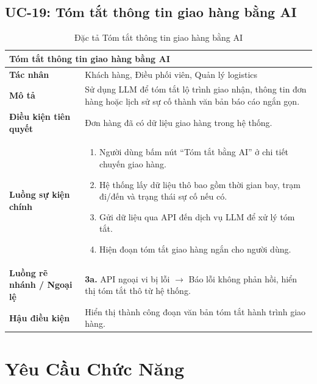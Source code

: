 \subsection{UC-19: Tóm tắt thông tin giao hàng bằng AI}
\begin{table}[H]
  \centering
  \begin{tabularx}{\textwidth}{|l|X|}
    \hline
    \multicolumn{2}{|l|}{\textbf{Tóm tắt thông tin giao hàng bằng AI}} \\
    \hline
    \textbf{Tác nhân}           & Khách hàng, Điều phối viên, Quản lý logistics \\ \hline
    \textbf{Mô tả}              & Sử dụng LLM để tóm tắt lộ trình giao nhận, thông tin đơn hàng hoặc lịch sử sự cố thành văn bản báo cáo ngắn gọn. \\ \hline
    \textbf{Điều kiện tiên quyết} & Đơn hàng đã có dữ liệu giao hàng trong hệ thống. \\ \hline
    \textbf{Luồng sự kiện chính} &
      \begin{enumerate}[leftmargin=*, nosep, topsep=0pt]
        \item Người dùng bấm nút ``Tóm tắt bằng AI'' ở chi tiết chuyến giao hàng.
        \item Hệ thống lấy dữ liệu thô bao gồm thời gian bay, trạm đi/đến và trạng thái sự cố nếu có.
        \item Gửi dữ liệu qua API đến dịch vụ LLM để xử lý tóm tắt.
        \item Hiện đoạn tóm tắt giao hàng ngắn cho người dùng.
      \end{enumerate} \\ \hline
    \textbf{Luồng rẽ nhánh / Ngoại lệ} &
      \textbf{3a.} API ngoại vi bị lỗi $\rightarrow$ Báo lỗi không phản hồi, hiển thị tóm tắt thô từ hệ thống. \\ \hline
    \textbf{Hậu điều kiện}      & Hiển thị thành công đoạn văn bản tóm tắt hành trình giao hàng. \\
    \hline
  \end{tabularx}
  \caption{Đặc tả Tóm tắt thông tin giao hàng bằng AI}
  \label{tab:uc19}
\end{table}

\section{Yêu Cầu Chức Năng}

